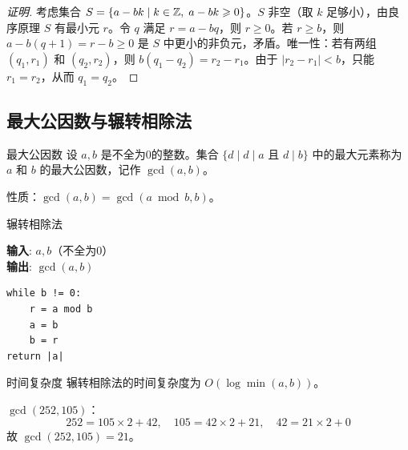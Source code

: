 \begin{proof}[证明]
考虑集合 \(S=\{a-bk\mid k\in\mathbb{Z},\;a-bk\geqslant 0\}\)。\(S\) 非空（取 \(k\) 足够小），由良序原理 \(S\) 有最小元 \(r\)。令 \(q\) 满足 \(r=a-bq\)，则 \(r\geqslant 0\)。若 \(r\geqslant b\)，则 \(a-b(q+1)=r-b\geqslant 0\) 是 \(S\) 中更小的非负元，矛盾。唯一性：若有两组 \((q_1,r_1)\) 和 \((q_2,r_2)\)，则 \(b(q_1-q_2)=r_2-r_1\)。由于 \(|r_2-r_1|<b\)，只能 \(r_1=r_2\)，从而 \(q_1=q_2\)。
\end{proof}

\subsection{最大公因数与辗转相除法}

\begin{mydefinition}{最大公因数}
设 \(a,b\) 是不全为0的整数。集合 \(\{d\mid d\mid a\text{ 且 }d\mid b\}\) 中的最大元素称为 \(a\) 和 \(b\) 的最大公因数，记作 \(\gcd(a,b)\)。
\end{mydefinition}

性质：\(\gcd(a,b) = \gcd(a\bmod b, b)\)。

\begin{myalgorithm}{辗转相除法}
\vspace{4pt}
\begin{minipage}{\textwidth}
\textbf{输入}: \(a,b\)（不全为0）\\
\textbf{输出}: \(\gcd(a,b)\)

\begin{verbatim}
while b != 0:
    r = a mod b
    a = b
    b = r
return |a|
\end{verbatim}
\end{minipage}
\end{myalgorithm}

\begin{myTheorem}{时间复杂度}
辗转相除法的时间复杂度为 \(O(\log \min(a,b))\)。
\end{myTheorem}

\begin{example}
\(\gcd(252,105)\)：
\[
252 = 105\times 2 + 42,\quad
105 = 42\times 2 + 21,\quad
42 = 21\times 2 + 0
\]
故 \(\gcd(252,105) = 21\)。
\end{example}

